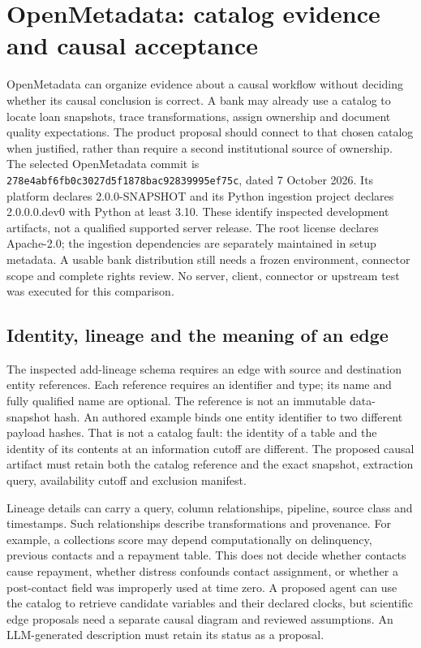 \section{OpenMetadata: catalog evidence and causal acceptance}
\label{sec:exec24-openmetadata}

OpenMetadata can organize evidence about a causal workflow without deciding
whether its causal conclusion is correct. A bank may already use a catalog to
locate loan snapshots, trace transformations, assign ownership and document
quality expectations. The product proposal should connect to that chosen
catalog when justified, rather than require a second institutional source of
ownership. The selected OpenMetadata commit is
\texttt{278e4abf6fb0c3027d5f1878bac92839995ef75c}, dated 7 October 2026.
Its platform declares 2.0.0-SNAPSHOT and its Python ingestion project declares
2.0.0.0.dev0 with Python at least 3.10. These identify inspected development
artifacts, not a qualified supported server release. The root license declares
Apache-2.0; the ingestion dependencies are separately maintained in setup
metadata. A usable bank distribution still needs a frozen environment, connector
scope and complete rights review. No server, client, connector or upstream test
was executed for this comparison.~\citep{exec24_openmetadata_source}

\subsection{Identity, lineage and the meaning of an edge}

The inspected add-lineage schema requires an edge with source and destination
entity references. Each reference requires an identifier and type; its name and
fully qualified name are optional. The reference is not an immutable data-snapshot
hash. An authored example binds one entity identifier to two different payload
hashes. That is not a catalog fault: the identity of a table and the identity of
its contents at an information cutoff are different. The proposed causal artifact
must retain both the catalog reference and the exact snapshot, extraction
query, availability cutoff and exclusion manifest.~\citep{exec24_openmetadata_source,exec24_openmetadata_reference}

Lineage details can carry a query, column relationships, pipeline, source class
and timestamps. Such relationships describe transformations and provenance.
For example, a collections score may depend computationally on delinquency,
previous contacts and a repayment table. This does not decide whether contacts
cause repayment, whether distress confounds contact assignment, or whether a
post-contact field was improperly used at time zero. A proposed agent can use
the catalog to retrieve candidate variables and their declared clocks, but
scientific edge proposals need a separate causal diagram and reviewed assumptions.
An LLM-generated description must retain its status as a proposal.
\citep{exec24_openmetadata_source}

